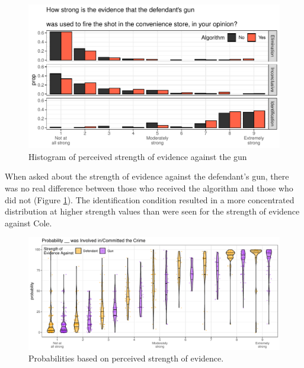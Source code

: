 \documentclass[print]{nuthesis}
\begin{document}
\begin{figure}

{\centering \includegraphics[width=\linewidth]{thesis_files/figure-latex/gunstrength-1} 

}

\caption{Histogram of perceived strength of evidence against the gun}\label{fig:gunstrength}
\end{figure}

When asked about the strength of evidence against the defendant's gun, there was no real difference between those who received the algorithm and those who did not (Figure \ref{fig:gunstrength}).
The identification condition resulted in a more concentrated distribution at higher strength values than were seen for the strength of evidence against Cole.

\begin{figure}

{\centering \includegraphics[width=\linewidth]{thesis_files/figure-latex/probstrength-1} 

}

\caption{Probabilities based on perceived strength of evidence.}\label{fig:probstrength}
\end{figure}
\end{document}

